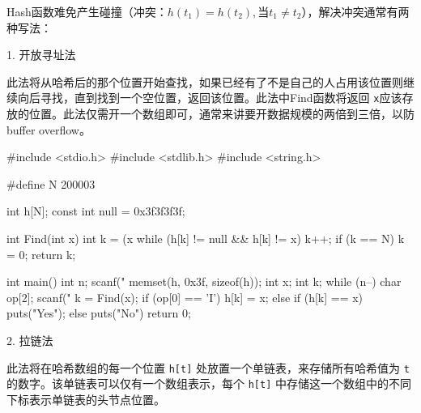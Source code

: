 Hash函数难免产生碰撞（冲突：$h(t_1) = h(t_2), \text{当} t_1 \neq t_2$），解决冲突通常有两种写法：

1. 开放寻址法

此法将从哈希后的那个位置开始查找，如果已经有了不是自己的人占用该位置则继续向后寻找，直到找到一个空位置，返回该位置。此法中Find函数将返回 \lstinline{x}应该存放的位置。此法仅需开一个数组即可，通常来讲要开数据规模的两倍到三倍，以防buffer overflow。

\begin{mycpptwocol}[开放寻址法]
    #include <stdio.h>
    #include <stdlib.h>
    #include <string.h>

    #define N 200003

    int h[N];
    const int null = 0x3f3f3f3f;

    int Find(int x) {
        int k = (x %
        while (h[k] != null && h[k] != x) {
            k++;
            if (k == N) {
                k = 0;
            }
        }
        return k;
    }

    int main() {
        int n;
        scanf("%
        memset(h, 0x3f, sizeof(h));
        int x;
        int k;
        while (n--) {
            char op[2];
            scanf("%
            k = Find(x);
            if (op[0] == 'I') {
                h[k] = x;
            } else {
                if (h[k] == x) {
                    puts("Yes");
                } else {
                    puts("No")
                }
            }
        }
        return 0;
    }
\end{mycpptwocol}

2. 拉链法

此法将在哈希数组的每一个位置 \lstinline{h[t]} 处放置一个单链表，来存储所有哈希值为 \lstinline{t} 的数字。该单链表可以仅有一个数组表示，每个 \lstinline{h[t]} 中存储这一个数组中的不同下标表示单链表的头节点位置。

